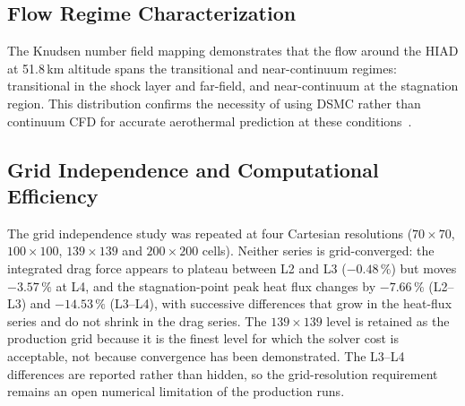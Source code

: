 \subsection{Flow Regime Characterization}
The Knudsen number field mapping demonstrates that the flow around the HIAD at 51.8\,km altitude spans the transitional and near-continuum regimes: transitional in the shock layer and far-field, and near-continuum at the stagnation region. This distribution confirms the necessity of using DSMC rather than continuum CFD for accurate aerothermal prediction at these conditions~\cite{bird1994molecular, plimpton2014sparta}.

\subsection{Grid Independence and Computational Efficiency}
The grid independence study was repeated at four Cartesian resolutions ($70\times70$, $100\times100$, $139\times139$ and $200\times200$ cells). Neither series is grid-converged: the integrated drag force appears to plateau between L2 and L3 ($-0.48\,\%$) but moves $-3.57\,\%$ at L4, and the stagnation-point peak heat flux changes by $-7.66\,\%$ (L2--L3) and $-14.53\,\%$ (L3--L4), with successive differences that grow in the heat-flux series and do not shrink in the drag series. The $139\times139$ level is retained as the production grid because it is the finest level for which the solver cost is acceptable, not because convergence has been demonstrated. The L3--L4 differences are reported rather than hidden, so the grid-resolution requirement remains an open numerical limitation of the production runs.

